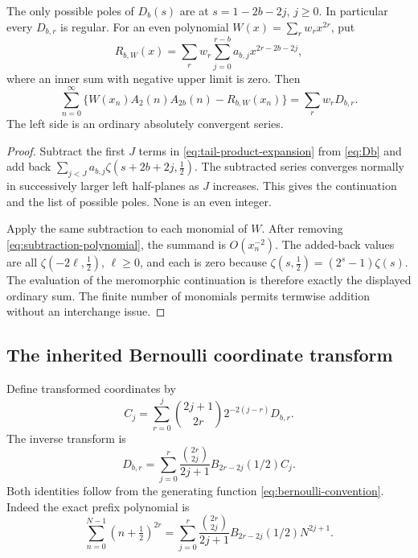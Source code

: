 \begin{proposition}
\label{prop:ordinary-subtraction}
The only possible poles of $D_b(s)$ are at
$s=1-2b-2j$, $j\geq0$. In particular every $D_{b,r}$ is regular.
For an even polynomial $W(x)=\sum_r w_rx^{2r}$, put
\begin{equation}\label{eq:subtraction-polynomial}
 R_{b,W}(x)=
 \sum_r w_r\sum_{j=0}^{r-b}a_{b,j}x^{2r-2b-2j},
\end{equation}
where an inner sum with negative upper limit is zero. Then
\begin{equation}\label{eq:ordinary-subtraction}
 \sum_{n=0}^{\infty}
  \{W(x_n)A_2(n)A_{2b}(n)-R_{b,W}(x_n)\}
 =\sum_r w_rD_{b,r}.
\end{equation}
The left side is an ordinary absolutely convergent series.
\end{proposition}
\begin{proof}
Subtract the first $J$ terms in \eqref{eq:tail-product-expansion} from
\eqref{eq:Db} and add back
$\sum_{j<J}a_{b,j}\zeta(s+2b+2j,\tfrac12)$.
The subtracted series converges normally in successively larger left
half-planes as $J$ increases. This gives the continuation and the list
of possible poles. None is an even integer.

Apply the same subtraction to each monomial of $W$. After removing
\eqref{eq:subtraction-polynomial}, the summand is $O(x_n^{-2})$.
The added-back values are all $\zeta(-2\ell,\tfrac12)$, $\ell\geq0$,
and each is zero because
$\zeta(s,\tfrac12)=(2^s-1)\zeta(s)$.
The evaluation of the meromorphic continuation is therefore exactly
the displayed ordinary sum. The finite number of monomials permits
termwise addition without an interchange issue.
\end{proof}

\subsection{The inherited Bernoulli coordinate transform}

Define transformed coordinates by
\begin{equation}\label{eq:C-from-D}
 C_j=\sum_{r=0}^j\binom{2j+1}{2r}2^{-2(j-r)}D_{b,r}.
\end{equation}
The inverse transform is
\begin{equation}\label{eq:D-from-C}
 D_{b,r}=\sum_{j=0}^r
   \frac{\binom{2r}{2j}}{2j+1}B_{2r-2j}(1/2)C_j.
\end{equation}
Both identities follow from the generating function
\eqref{eq:bernoulli-convention}. Indeed the exact prefix polynomial is
\begin{equation}\label{eq:prefix-polynomial}
 \sum_{n=0}^{N-1}(n+\tfrac12)^{2r}
 =\sum_{j=0}^r\frac{\binom{2r}{2j}}{2j+1}
       B_{2r-2j}(1/2)N^{2j+1}.
\end{equation}


